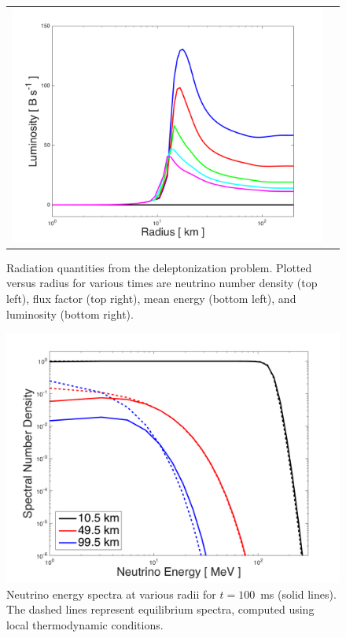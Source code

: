 \documentclass[10pt,preprint]{aastex}
\begin{document}
\begin{figure}
\begin{center}
\begin{tabular}{cc}
      \includegraphics[width=.475\textwidth]{./Figures/DeleptonizationProblem1D_Luminosity.png}
    \end{tabular}
  \end{center}
  \caption{Radiation quantities from the deleptonization problem.  Plotted versus radius for various times are neutrino number density (top left), flux factor (top right), mean energy (bottom left), and luminosity (bottom right).}
  \label{fig:}
\end{figure}

\begin{figure}
  \begin{center}
      \includegraphics[scale=0.78]{./Figures/DeleptonizationProblem1D_Spectra.png}
  \end{center}
  \caption{Neutrino energy spectra at various radii for $t=100$~ms (solid lines).  The dashed lines represent equilibrium spectra, computed using local thermodynamic conditions.}
  \label{fig:}
\end{figure}
\end{document}
